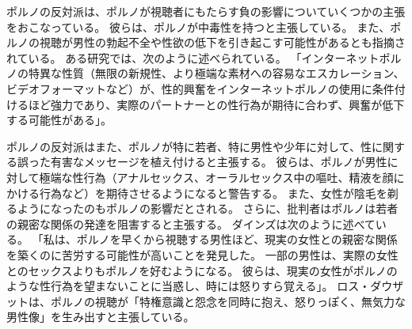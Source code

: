 \documentclass[paper=a4,book,openany]{jlreq}
\begin{document}
ポルノの反対派は、ポルノが視聴者にもたらす負の影響についていくつかの主張をおこなっている。
彼らは、ポルノが中毒性を持つと主張している\citep{snagowski15:_implic_assoc_cyber_addic}。
また、ポルノの視聴が男性の勃起不全や性欲の低下を引き起こす可能性があるとも指摘されている。
ある研究では、次のように述べられている。
「インターネットポルノの特異な性質（無限の新規性、より極端な素材への容易なエスカレーション、ビデオフォーマットなど）が、性的興奮をインターネットポルノの使用に条件付けるほど強力であり、実際のパートナーとの性行為が期待に合わず、興奮が低下する可能性がある」\citep[p.1]{park16:_is_inter_pornog_causin_sexual_dysfun}。

ポルノの反対派はまた、ポルノが特に若者、特に男性や少年に対して、性に関する誤った有害なメッセージを植え付けると主張する。
彼らは、ポルノが男性に対して極端な性行為（アナルセックス、オーラルセックス中の嘔吐、精液を顔にかける行為など）を期待させるようになると警告する。
また、女性が陰毛を剃るようになったのもポルノの影響だとされる\citep{fetters11:_new_full_front}。
さらに、批判者はポルノは若者の親密な関係の発達を阻害すると主張する。
ダインズは次のように述べている。
「私は、ポルノを早くから視聴する男性ほど、現実の女性との親密な関係を築くのに苦労する可能性が高いことを発見した。
一部の男性は、実際の女性とのセックスよりもポルノを好むようになる。
彼らは、現実の女性がポルノのような性行為を望まないことに当惑し、時には怒りすら覚える」\citep{bindel10:_truth_porn_indus}。
ロス・ダウザットは、ポルノの視聴が「特権意識と怨念を同時に抱え、怒りっぽく、無気力な男性像」を生み出すと主張している\citep{douthat18:_lets_ban_porn}。
\end{document}
